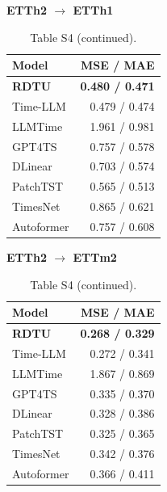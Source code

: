\begin{table}[H]\centering\small
\caption*{Table S4 (continued).}
\begin{minipage}[t]{0.48\linewidth}\vspace{0pt}\centering\small
\textbf{ETTh2 $\to$ ETTh1}\par\smallskip
\begin{tabular}{lr}\toprule Model & MSE / MAE\\\midrule
\rowcolor{blue!5}
\textbf{RDTU} & \textbf{0.480 / 0.471}\\
Time-LLM & 0.479 / 0.474\\
LLMTime & 1.961 / 0.981\\
GPT4TS & 0.757 / 0.578\\
DLinear & 0.703 / 0.574\\
PatchTST & 0.565 / 0.513\\
TimesNet & 0.865 / 0.621\\
Autoformer & 0.757 / 0.608\\
\bottomrule\end{tabular}\end{minipage}\hfill\begin{minipage}[t]{0.48\linewidth}\vspace{0pt}\centering\small
\textbf{ETTh2 $\to$ ETTm2}\par\smallskip
\begin{tabular}{lr}\toprule Model & MSE / MAE\\\midrule
\rowcolor{blue!5}
\textbf{RDTU} & \textbf{0.268 / 0.329}\\
Time-LLM & 0.272 / 0.341\\
LLMTime & 1.867 / 0.869\\
GPT4TS & 0.335 / 0.370\\
DLinear & 0.328 / 0.386\\
PatchTST & 0.325 / 0.365\\
TimesNet & 0.342 / 0.376\\
Autoformer & 0.366 / 0.411\\
\bottomrule\end{tabular}\end{minipage}
\end{table}
